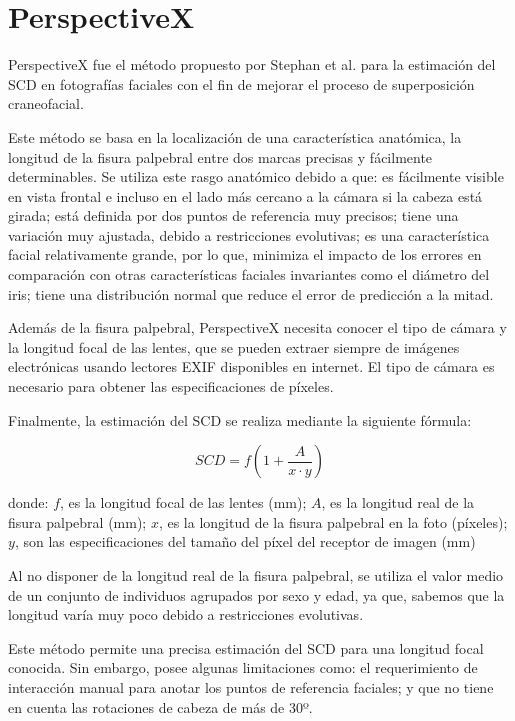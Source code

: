 \section{PerspectiveX}

PerspectiveX fue el método propuesto por Stephan et al. \cite{21} para la estimación del SCD en fotografías faciales con el fin de mejorar el proceso de superposición craneofacial.

Este método se basa en la localización de una característica anatómica, la longitud de la fisura palpebral entre dos marcas precisas y fácilmente determinables. Se utiliza este rasgo anatómico debido a que: es fácilmente visible en vista frontal e incluso en el lado más cercano a la cámara si la cabeza está girada; está definida por dos puntos de referencia muy precisos; tiene una variación muy ajustada, debido a restricciones evolutivas; es una característica facial relativamente grande, por lo que, minimiza el impacto de los errores en comparación con otras características faciales invariantes como el diámetro del iris; tiene una distribución normal que reduce el error de predicción a la mitad.

Además de la fisura palpebral, PerspectiveX necesita conocer el tipo de cámara y la longitud focal de las lentes, que se pueden extraer siempre de imágenes electrónicas usando lectores EXIF disponibles en internet. El tipo de cámara es necesario para obtener las especificaciones de píxeles.

Finalmente, la estimación del SCD se realiza mediante la siguiente fórmula:

\begin{equation}
	SCD = f (1+\frac{A}{x \cdot y})
\end{equation}

donde: $f$, es la longitud focal de las lentes (mm); $A$, es la longitud real de la fisura palpebral (mm); $x$, es la longitud de la fisura palpebral en la foto (píxeles); $y$, son las especificaciones del tamaño del píxel del receptor de imagen (mm)

Al no disponer de la longitud real de la fisura palpebral, se utiliza el valor medio de un conjunto de individuos agrupados por sexo y edad, ya que, sabemos que la longitud varía muy poco debido a restricciones evolutivas.

Este método permite una precisa estimación del SCD para una longitud focal conocida. Sin embargo, posee algunas limitaciones como: el requerimiento de interacción manual para anotar los puntos de referencia faciales; y que no tiene en cuenta las rotaciones de cabeza de más de 30º.


